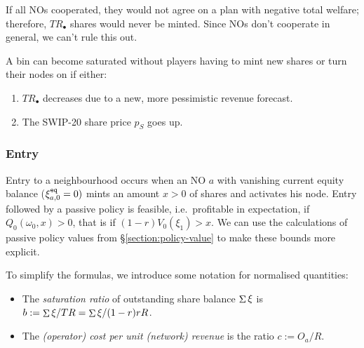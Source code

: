 If all NOs cooperated, they would not agree on a plan with negative total welfare; therefore, $TR_\bullet$ shares would never be minted.
%
Since NOs don't cooperate in general, we can't rule this out.

A bin can become saturated without players having to mint new shares or turn their nodes on if either:
\begin{enumerate}
  \item $TR_\bullet$ decreases due to a new, more pessimistic revenue forecast.
  \item The SWIP-20 share price $p_S$ goes up.
\end{enumerate}



\subsubsection{Entry}
\label{section:entry}
%
Entry to a neighbourhood occurs when an NO $a$ with vanishing current equity balance ($\xi^{\mathtt{eq}}_{a,0}=0)$ mints an amount $x>0$ of shares and activates his node.
%
Entry followed by a passive policy is feasible, i.e.~profitable in expectation, if $Q_0(\omega_0,x)>0$, that is if $(1-r)V_0(\xi_1) > x$.
%
We can use the calculations of passive policy values from \S\ref{section:policy-value} to make these bounds more explicit.

To simplify the formulas, we introduce some notation for normalised quantities:
%
\begin{itemize}
  \item The \emph{saturation ratio} of outstanding share balance $\mathop{\Sigma}\xi$ is $b:=\mathop{\Sigma}\xi/TR = \mathop{\Sigma}\xi/(1-r)rR$.
  \item The \emph{(operator) cost per unit (network) revenue} is the ratio $c:=O_a/R$.
\end{itemize}


